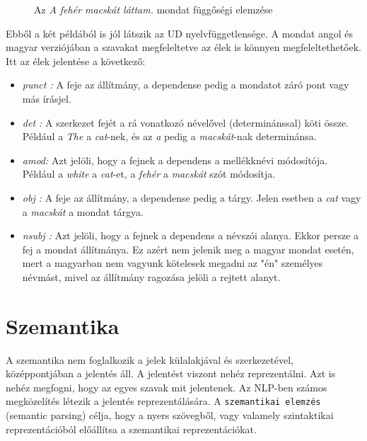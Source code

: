 \begin{figure}[h]
\centering 
{}
\caption{Az \textit{A fehér macskát láttam.} mondat függőségi elemzése}
\label{fig:deptreeHU}  
\end{figure}

Ebből a két példából is jól látszik az UD nyelvfüggetlensége. A mondat angol és magyar verziójában a szavakat megfeleltetve az élek is könnyen megfeleltethetőek.
Itt az élek jelentése a következő:
\begin{itemize}
\item \emph{punct : } 
A feje az állítmány, a dependense pedig a mondatot záró pont vagy más írásjel.
\item \emph{det : } 
A szerkezet fejét a rá vonatkozó névelővel (determinánssal) köti össze. 
Például a \textit{The} a \textit{cat}-nek, és az \textit{a} pedig a \textit{macskát}-nak determinánsa.
\item \emph{amod: } 
Azt jelöli, hogy a fejnek a dependens a mellékknévi módosítója.
Például a \textit{white} a \textit{cat}-et, a \textit{fehér} a \textit{macskát} szót módosítja.
\item \emph{obj : }  
A feje az állítmány, a dependense pedig a tárgy.
Jelen esetben a \textit{cat} vagy a \textit{macskát} a mondat tárgya.
\item \emph{nsubj : } 
Azt jelöli, hogy a fejnek a dependens a névszói alanya. 
Ekkor persze a fej a mondat állítmánya.
Ez azért nem jelenik meg a magyar mondat esetén, mert a magyarban nem vagyunk kötelesek megadni az "én" személyes névmást, mivel az állítmány ragozása jelöli a rejtett alanyt.
\end{itemize}

\section{Szemantika}
\label{sec:semantics}

A szemantika nem foglalkozik a jelek külalakjával és szerkezetével, középpontjában a jelentés áll.
A jelentést viszont nehéz reprezentálni. Azt is nehéz megfogni, hogy az egyes szavak mit jelentenek.
Az NLP-ben számos megközelítés létezik a jelentés reprezentálására. A \texttt{szemantikai elemzés} (semantic parsing) célja, hogy a nyers szövegből, vagy valamely szintaktikai reprezentációból előállítsa a szemantikai reprezentációkat.

